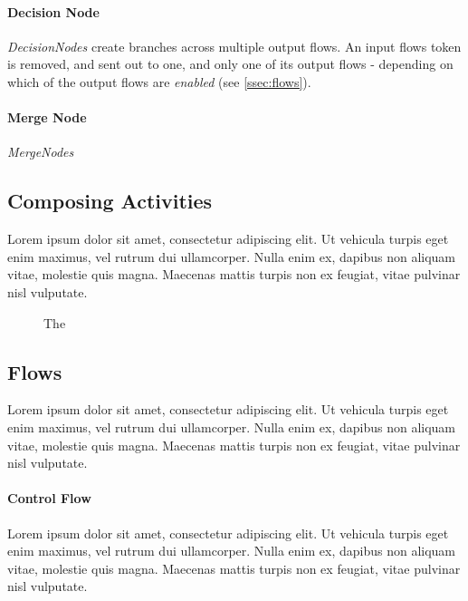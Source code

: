 \paragraph{Decision Node}

\emph{DecisionNodes} create branches across multiple output flows. An input flows token is removed, and sent out to one, and only one of its output flows - depending on which of the output flows are \emph{enabled} (see \autoref{ssec:flows}).

\paragraph{Merge Node}

\emph{MergeNodes} 

\subsection{Composing Activities}

Lorem ipsum dolor sit amet, consectetur adipiscing elit. Ut vehicula turpis eget enim maximus, vel rutrum dui ullamcorper. Nulla enim ex, dapibus non aliquam vitae, molestie quis magna. Maecenas mattis turpis non ex feugiat, vitae pulvinar nisl vulputate.

\begin{figure}[!ht]
\centering

\caption{The }
\label{fig:composite_activity}
\end{figure}

\subsection{Flows}\label{ssec:flows}

Lorem ipsum dolor sit amet, consectetur adipiscing elit. Ut vehicula turpis eget enim maximus, vel rutrum dui ullamcorper. Nulla enim ex, dapibus non aliquam vitae, molestie quis magna. Maecenas mattis turpis non ex feugiat, vitae pulvinar nisl vulputate.

\paragraph{Control Flow}

Lorem ipsum dolor sit amet, consectetur adipiscing elit. Ut vehicula turpis eget enim maximus, vel rutrum dui ullamcorper. Nulla enim ex, dapibus non aliquam vitae, molestie quis magna. Maecenas mattis turpis non ex feugiat, vitae pulvinar nisl vulputate.

